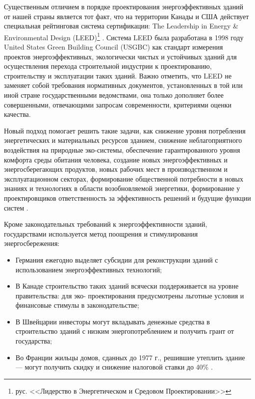 

Существенным отличием в порядке проектирования энергоэффективных зданий от нашей страны является тот факт, что на территории Канады и США действует
специальная рейтинговая система сертификации: The Leadership in Energy \& Environmental Design (LEED)\footnote{рус. <<Лидерство в Энергетическом и Средовом Проектировании>>} \cite{method_US_LEED} .
Система LEED была разработана в 1998 году United States Green Building Council (USGBC) как стандарт измерения проектов энергоэффективных,
экологически чистых и устойчивых зданий для осуществления перехода строительной индустрии к проектированию, строительству и эксплуатации таких зданий.
Важно отметить, что LEED не заменяет собой требования нормативных документов, установленных в той или иной стране государственными ведомствами,
она только дополняет более совершенными, отвечающими запросам современности, критериями оценки качества.

Новый подход помогает решить такие задачи, как снижение уровня потребления энергетических и материальных ресурсов зданием,
снижение неблагоприятного воздействия на природные эко-системы, обеспечение гарантированного уровня комфорта среды обитания человека,
создание новых энергоэффективных и энергосберегающих продуктов, новых рабочих мест в производственном и эксплуатационном секторах,
формирование общественной потребности в новых знаниях и технологиях в области возобновляемой энергетики, формирование у проектировщиков ответственность за
эффективность решений и будущие функции систем \cite{method_US_LEED}.

Кроме законодательных требований к энергоэффективности зданий, государствами используется метод поощрения и стимулирования энергосбережения:
\begin{itemize}
    \item Германия ежегодно выделяет субсидии для реконструкции зданий с использованием энергоэффективных технологий;
    \item В Канаде строительство таких зданий всячески поддерживается на уровне правительства: для эко- проектирования предусмотрены льготные условия и финансовые стимулы в законодательстве;
    \item В Швейцарии инвесторы могут вкладывать денежные средства в строительство зданий с низким энергопотреблением и получить грант от государства;
    \item Во Франции жильцы домов, сданных до 1977 г., решившие утеплить здание --- могут получить скидку и снижение налоговой ставки до 40\% \cite{2016buee_Sheyna_AltenergyWorldtrands}.
\end{itemize}

